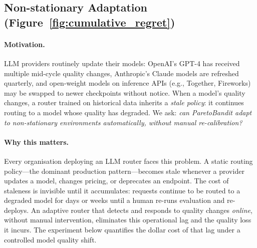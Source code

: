 
\subsection{Non-stationary Adaptation (Figure~\ref{fig:cumulative_regret})}
\label{sec:nonstationarity}

\paragraph{Motivation.}
LLM providers routinely update their models: OpenAI's GPT-4 has
received multiple mid-cycle quality changes, Anthropic's Claude
models are refreshed quarterly, and open-weight models on inference
APIs (e.g., Together, Fireworks) may be swapped to newer
checkpoints without notice.
When a model's quality changes, a router trained on historical data
inherits a \emph{stale policy}: it continues routing to a model
whose quality has degraded.
We ask: \emph{can ParetoBandit adapt to non-stationary environments
automatically, without manual re-calibration?}

\paragraph{Why this matters.}
Every organisation deploying an LLM router faces this problem.
A static routing policy---the dominant production pattern---becomes
stale whenever a provider updates a model, changes pricing, or
deprecates an endpoint.
The cost of staleness is invisible until it accumulates:
requests continue to be routed to a degraded model for days or
weeks until a human re-runs evaluation and re-deploys.
An adaptive router that detects and responds to quality changes
\emph{online}, without manual intervention, eliminates this
operational lag and the quality loss it incurs.
The experiment below quantifies the dollar cost of that lag
under a controlled model quality shift.

